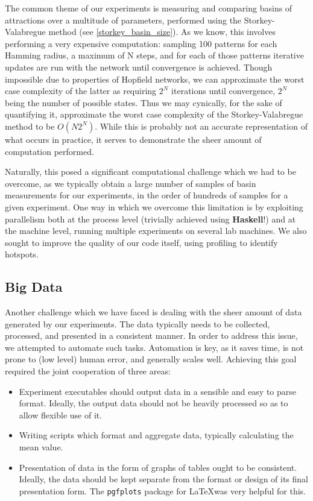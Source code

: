 The common theme of our experiments is measuring and comparing basins of attractions over a multitude of parameters, performed using the Storkey-Valabregue method (see \ref{storkey_basin_size}). As we know, this involves performing a very expensive computation: sampling 100 patterns for each Hamming radius, a maximum of N steps, and for each of those patterns iterative updates are run with the network until convergence is achieved. Though impossible due to properties of Hopfield networks, we can approximate the worst case complexity of the latter as requiring $2^N$ iterations until convergence, $2^N$ being the number of possible states. Thus we may cynically, for the sake of quantifying it, approximate the worst case complexity of the Storkey-Valabregue method to be $O(N2^N)$. While this is probably not an accurate representation of what occurs in practice, it serves to demonstrate the sheer amount of computation performed.

Naturally, this posed a significant computational challenge which we had to be overcome, as we typically obtain a large number of samples of basin measurements for our experiments, in the order of hundreds of samples for a given experiment. One way in which we overcome this limitation is by exploiting parallelism both at the process level (trivially achieved using \textbf{Haskell}!) and at the machine level, running multiple experiments on several lab machines. We also sought to improve the quality of our code itself, using profiling to identify hotspots.


\subsection{Big Data}

Another challenge which we have faced is dealing with the sheer amount of data generated by our experiments. The data typically needs to be collected, processed, and presented in a consistent manner. In order to address this issue, we attempted to automate such tasks. Automation is key, as it saves time, is not prone to (low level) human error, and generally scales well. Achieving this goal required the joint cooperation of three areas:

\begin{itemize}
\item Experiment executables should output data in a sensible and easy to parse format. Ideally, the output data should not be heavily processed so as to allow flexible use of it.

\item Writing scripts which format and aggregate data, typically calculating the mean value.

\item Presentation of data in the form of graphs of tables ought to be consistent. Ideally, the data should be kept separate from the format or design of its final presentation form. The \texttt{pgfplots} package for \LaTeX was very helpful for this.
\end{itemize}


